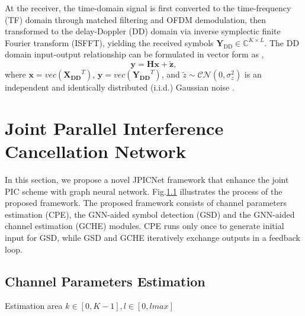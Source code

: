\documentclass[journal]{IEEEtran}
\begin{document}
At the receiver, the time-domain signal is first converted to the time-frequency (TF) domain through matched filtering and OFDM demodulation, then transformed to the delay-Doppler (DD) domain via inverse symplectic finite Fourier transform (ISFFT), yielding the received symbols $\bm{Y}_{\text{DD}}\in \mathbb{C}^{K\times L}$. The DD domain input-output relationship can be formulated in vector form as \cite{10264119},
\begin{equation}
\bm{y} = \bm{Hx} + \bm{\tilde{z}},
\label{eq:sys-DD}
\end{equation}
where $\bm{x} = vec(\bm{X_{DD}}^T)$, $\bm{y} = vec(\bm{Y_{DD}}^T)$, and $\tilde{z} \sim \mathcal{CN}(0, \sigma_z^2)$ is an independent and identically distributed (i.i.d.) Gaussian noise \cite{8516353, 10264119, 7925924}.



\section{Joint Parallel Interference Cancellation Network}

In this section, we propose a novel JPICNet framework that enhance the joint PIC scheme with graph neural network. Fig.\ref{} illustrates the process of the proposed framework. The proposed framework consists of channel parameters estimation (CPE), the GNN-aided symbol detection (GSD) and the GNN-aided channel estimation (GCHE) modules. CPE runs only once to generate initial input for GSD, while GSD and GCHE iteratively exchange outputs in a feedback loop.

\subsection{Channel Parameters Estimation}
Estimation area $k \in [0, K-1], l \in [0, lmax]$
\end{document}
